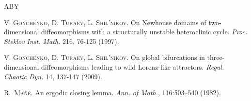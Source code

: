 \documentclass[11pt, a4paper]{amsart}
\theoremstyle{plain}
\theoremstyle{definition}
\theoremstyle{remark}
\numberwithin{equation}{section}         %
\begin{document}
\begin{thebibliography}{ABY}

\textsc{V. Gonchenko, D. Turaev, L. Shil'nikov.}
 On Newhouse domains of two-dimensional diffeomorphisms with a structurally unstable heteroclinic cycle.
 {\it Proc. Steklov Inst. Math.} 216, 76-125 (1997).
%

\textsc{V. Gonchenko, D. Turaev, L. Shil'nikov.}
 On global bifurcations in three-dimensional diffeomorphisms leading to wild Lorenz-like attractors.
 {\em Regul. Chaotic Dyn.} 14, 137-147 (2009).




%









\textsc{R.~Ma\~{n}\'{e}.}
An ergodic closing lemma.
{\em Ann. of Math.}, 116:503--540 (1982).



\end{thebibliography}
\end{document}

